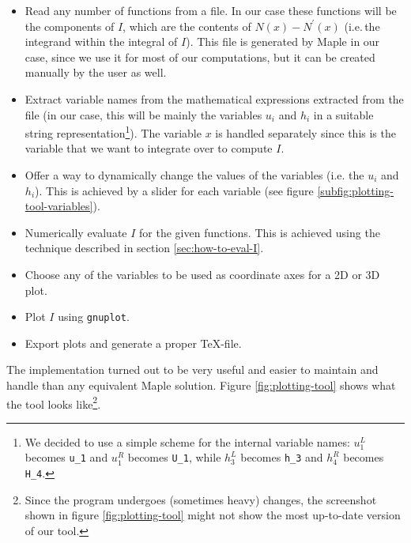 \documentclass{article}
\begin{document}
\begin{itemize}
\item Read any number of functions from a file. In our case these functions will be the components of $I$, which are the contents of $N\left(x\right)-N^\prime\left(x\right)$ (i.e.\,the integrand within the integral of $I$). This file is generated by Maple in our case, since we use it for most of our computations, but it can be created manually by the user as well.
\item Extract variable names from the mathematical expressions extracted from the file (in our case, this will be mainly the variables $u_i$ and $h_i$ in a suitable string representation\footnote{We decided to use a simple scheme for the internal variable names: $u_1^L$ becomes \texttt{u\_1} and $u_1^R$ becomes \texttt{U\_1}, while $h_3^L$ becomes \texttt{h\_3} and $h_4^R$ becomes \texttt{H\_4}.}). The variable $x$ is handled separately since this is the variable that we want to integrate over to compute $I$.
\item Offer a way to dynamically change the values of the variables (i.e. the $u_i$ and $h_i$). This is achieved by a slider for each variable (see figure \ref{subfig:plotting-tool-variables}).
\item Numerically evaluate $I$ for the given functions. This is achieved using the technique described in section \ref{sec:how-to-eval-I}.
\item Choose any of the variables to be used as coordinate axes for a 2D or 3D plot.
\item Plot $I$ using \texttt{gnuplot}.
\item Export plots and generate a proper TeX-file.
\end{itemize}

The implementation turned out to be very useful and easier to maintain and handle than any equivalent Maple solution. Figure \ref{fig:plotting-tool} shows what the tool looks like\footnote{Since the program undergoes (sometimes heavy) changes, the screenshot shown in figure \ref{fig:plotting-tool} might not show the most up-to-date version of our tool.}.
\end{document}
